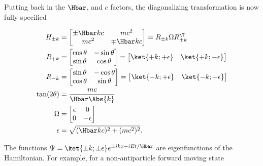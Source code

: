 Putting back in the \( \Hbar \), and \( c\) factors, the diagonalizing transformation is now fully specified

\begin{equation}\label{eqn:gradQuantumProblemSet4Problem3:520}
\begin{aligned}
H_{\pm k} &=
\begin{bmatrix}
\pm \Hbar k c & m c^2 \\
m c^2 & \mp \Hbar k c
\end{bmatrix}
=
R_{\pm k} \Omega R_{\pm k}^\T \\
R_{+ k} &=
\begin{bmatrix}
\cos\theta & -\sin\theta  \\
\sin\theta & \cos\theta
\end{bmatrix}
=
\begin{bmatrix}
\ket{+k;+\epsilon} &
\ket{+k;-\epsilon}
\end{bmatrix}
\\
R_{- k} &=
\begin{bmatrix}
\sin\theta & -\cos\theta  \\
\cos\theta & \sin\theta
\end{bmatrix}
=
\begin{bmatrix}
\ket{-k;+\epsilon} &
\ket{-k;-\epsilon}
\end{bmatrix}
\\
\tan(2 \theta) &= \frac{m c}{\Hbar \Abs{k}} \\
\Omega &=
\begin{bmatrix}
\epsilon & 0 \\
0 & -\epsilon
\end{bmatrix} \\
\epsilon &= \sqrt{(\Hbar k c)^2 + (m c^2)^2}.
\end{aligned}
\end{equation}

The functions \( \Psi = \ket{\pm k; \pm \epsilon} e^{\pm i k x - i E t/\Hbar} \) are eigenfunctions of the Hamiltonian.  For example, for a non-antiparticle forward moving state

